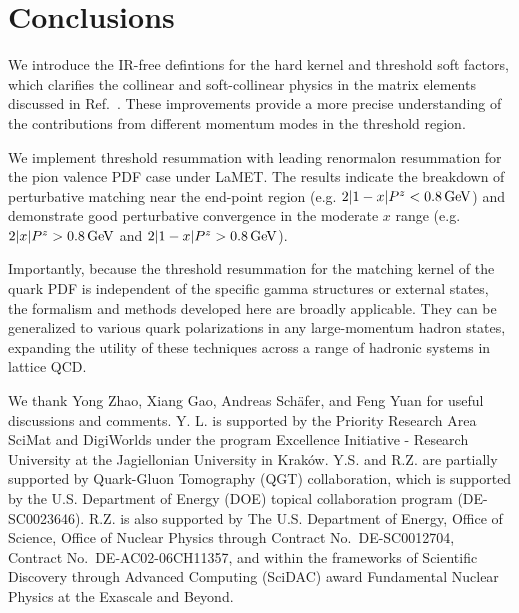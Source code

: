 \documentclass[a4paper,11pt]{article}
\begin{document}
\section{Conclusions}\label{sec:conclu}


We introduce the IR-free defintions for the hard kernel and threshold soft factors, which clarifies the collinear and soft-collinear physics in the matrix elements discussed in Ref.~\cite{Ji:2023pba}. These improvements provide a more precise understanding of the contributions from different momentum modes in the threshold region. 
 
We implement threshold resummation with leading renormalon resummation for the pion valence PDF case under LaMET. The results indicate the breakdown of perturbative matching near the end-point region (e.g. $ 2|1-x|P^z < 0.8 \, {\rm GeV}$) and demonstrate good perturbative convergence in the moderate $x$ range (e.g. $2|x|P^z > 0.8 \, {\rm GeV}$ and $2|1-x|P^z > 0.8 \, {\rm GeV}$). 

Importantly, because the threshold resummation for the matching kernel of the quark PDF is independent of the specific gamma structures or external states, the formalism and methods developed here are broadly applicable. They can be generalized to various quark polarizations in any large-momentum hadron states, expanding the utility of these techniques across a range of hadronic systems in lattice QCD.


\acknowledgments
We thank Yong Zhao, Xiang Gao, Andreas Schäfer, and Feng Yuan for useful discussions and comments. 
Y. L. is supported by the Priority Research Area SciMat and DigiWorlds under the program Excellence Initiative - Research University at the Jagiellonian University in Krak\'{o}w. Y.S. and R.Z. are partially supported by Quark-Gluon Tomography (QGT) collaboration, which is supported by the U.S. Department of Energy (DOE) topical collaboration program (DE-SC0023646). R.Z. is also supported by The U.S. Department of Energy, Office of Science, Office of Nuclear Physics through Contract No.~DE-SC0012704, Contract No.~DE-AC02-06CH11357, and within the frameworks of Scientific Discovery through Advanced Computing (SciDAC) award Fundamental Nuclear Physics at the Exascale and Beyond.
\end{document}
